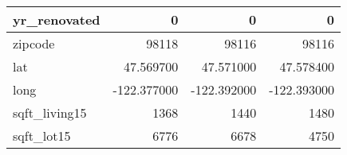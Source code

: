 \begin{table}[H]
\begin{tabular}{|l|r|r|r|}
\hline yr\_renovated & \cellcolor[rgb]{0.9, 0.54, 0.52} 0 & \cellcolor[rgb]{0.9, 0.54, 0.52} 0 & \cellcolor[rgb]{0.9, 0.54, 0.52} 0 \\
\hline zipcode & \cellcolor[rgb]{0.9, 0.54, 0.52} 98118 & 98116 & 98116 \\
\hline lat & \cellcolor[rgb]{0.9, 0.54, 0.52} 47.569700 & 47.571000 & 47.578400 \\
\hline long & \cellcolor[rgb]{0.9, 0.54, 0.52} -122.377000 & \cellcolor[rgb]{0.9, 0.54, 0.52} -122.392000 & \cellcolor[rgb]{0.9, 0.54, 0.52} -122.393000 \\
\hline sqft\_living15 & \cellcolor[rgb]{0.9, 0.54, 0.52} 1368 & 1440 & 1480 \\
\hline sqft\_lot15 & \cellcolor[rgb]{0.9, 0.54, 0.52} 6776 & 6678 & 4750 \\
\hline
\end{tabular}
\end{table}
